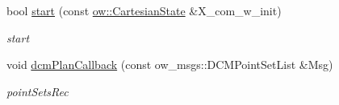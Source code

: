 \begin{DoxyCompactItemize}
bool \hyperlink{classow__com__tg_1_1COMTrajectoryGenerator_a8aaaf0085e5a95a0bd99c88f2b8e04c1}{start} (const \hyperlink{classow__core_1_1CartesianState}{ow\+::\+Cartesian\+State} \&X\+\_\+com\+\_\+w\+\_\+init)
\begin{DoxyCompactList}\small\item\em start \end{DoxyCompactList}\item 
void \hyperlink{classow__com__tg_1_1COMTrajectoryGenerator_aa2391dd6afa57ea9124af290a4ba4287}{dcm\+Plan\+Callback} (const ow\+\_\+msgs\+::\+D\+C\+M\+Point\+Set\+List \&Msg)
\begin{DoxyCompactList}\small\item\em point\+Sets\+Rec \end{DoxyCompactList}\end{DoxyCompactItemize}
